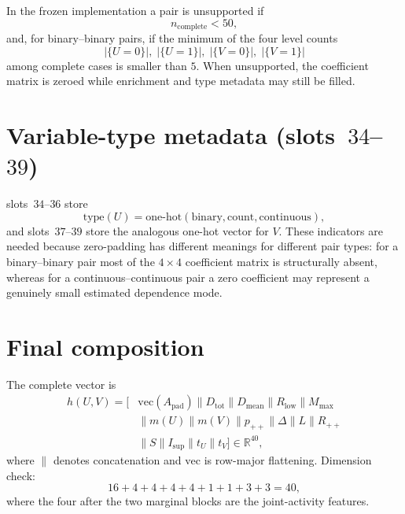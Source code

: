 In the frozen implementation a pair is unsupported if
\begin{equation}
n_{\mathrm{complete}}<50,
\end{equation}
and, for binary--binary pairs, if the minimum of the four level counts
\begin{equation}
\lvert\{U=0\}\rvert,\;
\lvert\{U=1\}\rvert,\;
\lvert\{V=0\}\rvert,\;
\lvert\{V=1\}\rvert
\end{equation}
among complete cases is smaller than $5$.
When unsupported, the coefficient matrix is zeroed while enrichment and type metadata may still be filled.

\section{Variable-type metadata (slots~$34$--$39$)}
\label{app:hcr-types}

slots~$34$--$36$ store
\begin{equation}
\mathrm{type}(U)=\mathrm{one\text{-}hot}(\mathrm{binary},\mathrm{count},\mathrm{continuous}),
\end{equation}
and slots~$37$--$39$ store the analogous one-hot vector for $V$.
These indicators are needed because zero-padding has different meanings for different pair types:
for a binary--binary pair most of the $4\times 4$ coefficient matrix is structurally absent, whereas for a continuous--continuous pair a zero coefficient may represent a genuinely small estimated dependence mode.

\section{Final composition}
\label{app:hcr-compose}

The complete vector is
\begin{equation}
\begin{aligned}
h(U,V)
=
\bigl[
&\mathrm{vec}(A_{\mathrm{pad}})
\parallel
D_{\mathrm{tot}}
\parallel
D_{\mathrm{mean}}
\parallel
R_{\mathrm{low}}
\parallel
M_{\max}
\\
&\parallel
m(U)
\parallel
m(V)
\parallel
p_{++}
\parallel
\Delta
\parallel
L
\parallel
R_{++}
\\
&\parallel
S
\parallel
I_{\mathrm{sup}}
\parallel
t_{U}
\parallel
t_{V}
\bigr]
\in\mathbb{R}^{40},
\end{aligned}
\end{equation}
where $\parallel$ denotes concatenation and $\mathrm{vec}$ is row-major flattening.
Dimension check:
\begin{equation}
16+4+4+4+4+1+1+3+3=40,
\end{equation}
where the four after the two marginal blocks are the joint-activity features.

